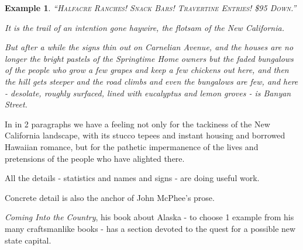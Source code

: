 \documentclass{book}
\numberwithin{equation}{section}
\newtheorem{example}{Example}[chapter]
\begin{document}
\begin{example}
    ``\textsc{Halfacre Ranches! Snack Bars! Travertine Entries! \$95 Down}.''
    
    It is the trail of an intention gone haywire, the flotsam of the New California.
    
    But after a while the signs thin out on Carnelian Avenue, and the houses are no longer the bright pastels of the Springtime Home owners but the faded bungalows of the people who grow a few grapes and keep a few chickens out here, and then the hill gets steeper and the road climbs and even the bungalows are few, and here - desolate, roughly surfaced, lined with eucalyptus and lemon groves - is Banyan Street.
\end{example}
In in 2 paragraphs we have a feeling not only for the tackiness of the New California landscape, with its stucco tepees and instant housing and borrowed Hawaiian romance, but for the pathetic impermanence of the lives and pretensions of the people who have alighted there.

All the details - statistics and names and signs - are doing useful work.

%
Concrete detail is also the anchor of John McPhee's prose.

\textit{Coming Into the Country}, his book about Alaska - to choose 1 example from his many craftsmanlike books - has a section devoted to the quest for a possible new state capital.
\end{document}
